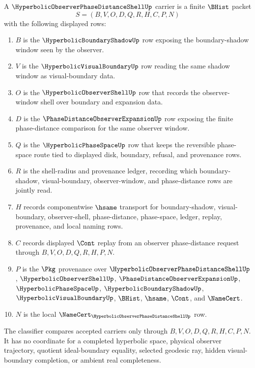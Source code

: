 \begin{definition}
\label{def:hyperbolic-observer-phase-distance-shell-carrier}
A $\HyperbolicObserverPhaseDistanceShellUp$ carrier is a finite $\BHist$ packet
$$
S=(B,V,O,D,Q,R,H,C,P,N)
$$
with the following displayed rows:
\begin{enumerate}
\item $B$ is the $\HyperbolicBoundaryShadowUp$ row exposing the boundary-shadow window seen by the observer.
\item $V$ is the $\HyperbolicVisualBoundaryUp$ row reading the same shadow window as visual-boundary data.
\item $O$ is the $\HyperbolicObserverShellUp$ row that records the observer-window shell over boundary and expansion data.
\item $D$ is the $\PhaseDistanceObserverExpansionUp$ row exposing the finite phase-distance comparison for the same observer window.
\item $Q$ is the $\HyperbolicPhaseSpaceUp$ row that keeps the reversible phase-space route tied to displayed disk, boundary, refusal, and provenance rows.
\item $R$ is the shell-radius and provenance ledger, recording which boundary-shadow, visual-boundary, observer-window, and phase-distance rows are jointly read.
\item $H$ records componentwise $\hsame$ transport for boundary-shadow, visual-boundary, observer-shell, phase-distance, phase-space, ledger, replay, provenance, and local naming rows.
\item $C$ records displayed $\Cont$ replay from an observer phase-distance request through $B,V,O,D,Q,R,H,P,N$.
\item $P$ is the $\Pkg$ provenance over $\HyperbolicObserverPhaseDistanceShellUp$, $\HyperbolicObserverShellUp$, $\PhaseDistanceObserverExpansionUp$, $\HyperbolicPhaseSpaceUp$, $\HyperbolicBoundaryShadowUp$, $\HyperbolicVisualBoundaryUp$, $\BHist$, $\hsame$, $\Cont$, and $\NameCert$.
\item $N$ is the local $\NameCert_{\HyperbolicObserverPhaseDistanceShellUp}$ row.
\end{enumerate}
The classifier compares accepted carriers only through $B,V,O,D,Q,R,H,C,P,N$. It has no coordinate for a completed hyperbolic space, physical observer trajectory, quotient ideal-boundary equality, selected geodesic ray, hidden visual-boundary completion, or ambient real completeness.
\end{definition}

